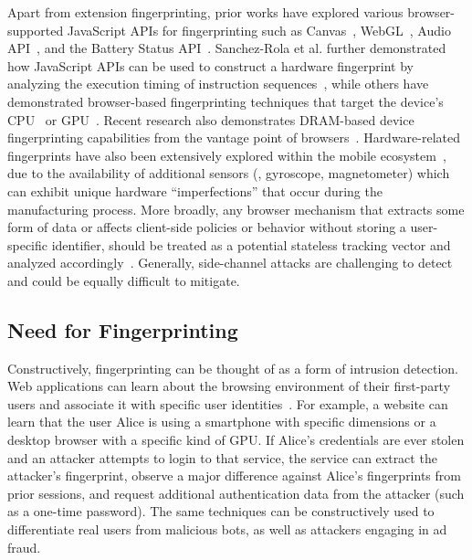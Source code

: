 Apart from extension fingerprinting, prior works have explored various browser-supported JavaScript APIs for fingerprinting such as Canvas~\cite{moweryPixelPerfectFingerprinting2012}, WebGL~\cite{caoCrossBrowserFingerprintingOS2017}, Audio API~\cite{englehardtOnlineTracking1millionsite2016}, and the Battery Status API~\cite{olejnikLeakingBatteryPrivacy2016}. 
%
Sanchez-Rola et al. further demonstrated how JavaScript APIs can be used to construct a hardware fingerprint by analyzing the execution timing of instruction sequences~\cite{sanchez-rolaClockClockTimeBased2018}, while others have demonstrated browser-based fingerprinting techniques that target the device's CPU~\cite{trampertBrowserBasedCPUFingerprinting2022,matyuninTrackingPrivateBrowsing2018} or GPU~\cite{laorDRAWNAPARTDevice2022}. 
%
Recent research also demonstrates DRAM-based device fingerprinting capabilities from the vantage point of browsers~\cite{venugopalanFPRowhammerDRAMBasedDevice2024}.
%
Hardware-related fingerprints have also been extensively explored within the mobile ecosystem~\cite{bojinovMobileDeviceIdentification2014,dasTrackingMobileWeb2016,marcantoniLargescaleStudyRisks2019,hupperichRobustnessMobileDevice2015,deyAccelPrintImperfectionsAccelerometers2014,zhang2019sensorid}, due to the availability of additional sensors (\eg{}, gyroscope, magnetometer) which can exhibit unique hardware ``imperfections'' that occur during the manufacturing process. 
%
More broadly, any browser mechanism that extracts some form of data or affects client-side policies or behavior without storing a user-specific identifier, should be treated as a potential stateless tracking vector and analyzed accordingly~\cite{aliNavigatingMurkyWaters2023}. 
%
Generally, side-channel attacks are challenging to detect and could be equally difficult to mitigate.


\subsection{Need for Fingerprinting}
\label{sec:need-for-fingerprinting}


Constructively, fingerprinting can be thought of as a form of intrusion detection. 
%
Web applications can learn about the browsing environment of their first-party users and associate it with specific user identities~\cite{LinPhishSheepsClothing2022}. 
%
For example, a website can learn that the user Alice is using a smartphone with specific dimensions or a desktop browser with a specific kind of GPU. 
%
If Alice's credentials are ever stolen and an attacker attempts to login to that service, the service can extract the attacker's fingerprint, observe a major difference against Alice's fingerprints from prior sessions, and request additional authentication data from the attacker (such as a one-time password).
%
The same techniques can be constructively used to differentiate real users from malicious bots, as well as attackers engaging in ad fraud.

